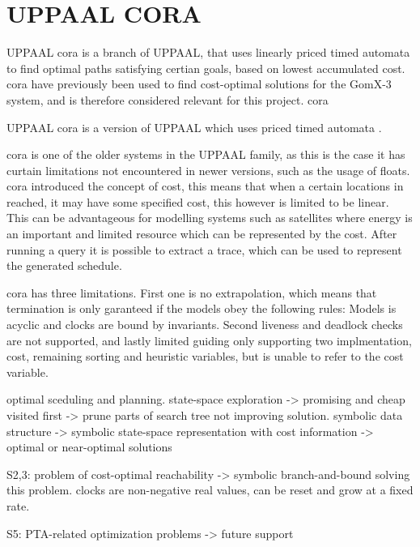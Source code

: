 \section{UPPAAL CORA}
UPPAAL \gls{cora} is a branch of UPPAAL, that uses linearly priced timed automata \cite{cs_cora} to find optimal paths satisfying certian goals, based on lowest accumulated cost. 
\Gls{cora} have previously been used to find cost-optimal solutions for the GomX-3 system\cite{gomx3}, and is therefore considered relevant for this project. \Gls{cora}


UPPAAL \gls{cora} is a version of UPPAAL which uses priced timed automata \cite{cs_cora}. 

\Gls{cora} is one of the older systems in the UPPAAL family, as this is the case it has curtain limitations not encountered in newer versions, such as the usage of floats. 
\Gls{cora} introduced the concept of cost, this means that when a certain locations in reached, it may have some specified cost, this however is limited to be linear. \\
This can be advantageous for modelling systems such as satellites where energy is an important and limited resource which can be represented by the cost. After running a query it is possible to extract a trace, which can be used to represent the generated schedule.

\Gls{cora} has three limitations. First one is no extrapolation, which means that termination is only garanteed if the models obey the following rules: Models is acyclic and clocks are bound by invariants. Second liveness and deadlock checks are not supported, and lastly limited guiding only supporting two implmentation, cost, remaining sorting and heuristic variables, but is unable to refer to the cost variable. 



optimal sceduling and planning.
state-space exploration -> promising and cheap visited first -> prune parts of search tree not improving solution.
symbolic data structure -> symbolic state-space representation with cost information -> optimal or near-optimal solutions

S2,3: problem of cost-optimal reachability -> symbolic branch-and-bound solving this problem.
 clocks are non-negative real values, can be reset and grow at a fixed rate.

S5: PTA-related optimization problems -> future support

